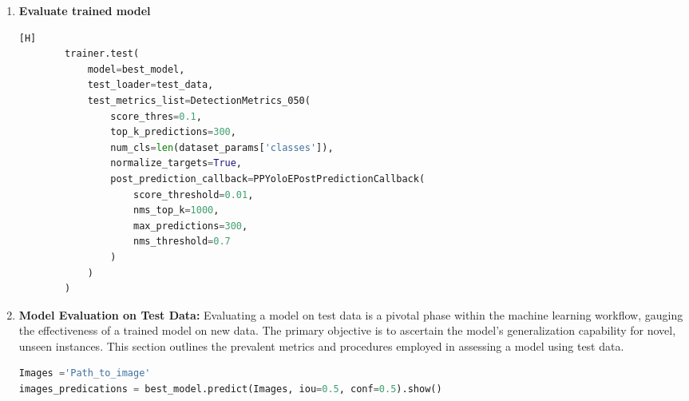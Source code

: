 \begin{enumerate}
\begin{addmargin}[8mm]{0mm}
\begin{lstlisting}[language=Python, caption=Load trained model][H]
    # Path to the best weight checkpoint
    averaged_checkpoint_path = 'checkpoints/Experiment_name/average_model.pth'
    
    # Retrieve the model with averaged weights
    best_model = models.get(
            selected_model_arch,
            num_classes=len(dataset_params['classes']),
            checkpoint_path=f"{CHECKPOINT_DIR}/{EXPERIMENT_NAME}/ckpt_best.pth"
    ).to(DEVICE)
    \end{lstlisting}
    \end{addmargin}
    \item \textbf{Evaluate trained model}
    \begin{addmargin}[8mm]{0mm}
    \begin{lstlisting}[language=Python, caption=Model Evaluation on Test Data][H]
        trainer.test(
            model=best_model,
            test_loader=test_data,
            test_metrics_list=DetectionMetrics_050(
                score_thres=0.1,
                top_k_predictions=300,
                num_cls=len(dataset_params['classes']),
                normalize_targets=True,
                post_prediction_callback=PPYoloEPostPredictionCallback(
                    score_threshold=0.01,
                    nms_top_k=1000,
                    max_predictions=300,
                    nms_threshold=0.7
                )
            )
        )
    \end{lstlisting}
    \end{addmargin}
    \item \textbf{Model Evaluation on Test Data: } Evaluating a model on test data is a pivotal phase within the machine learning workflow, gauging the effectiveness of a trained model on new data. The primary objective is to ascertain the model's generalization capability for novel, unseen instances. This section outlines the prevalent metrics and procedures employed in assessing a model using test data.
\begin{addmargin}[8mm]{0mm} 
\footnotesize
\begin{lstlisting}[language=Python, caption=Inference with trained model]
Images ='Path_to_image'
images_predications = best_model.predict(Images, iou=0.5, conf=0.5).show()   
\end{lstlisting}
\end{addmargin}


    

\end{enumerate}